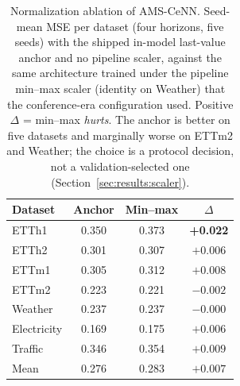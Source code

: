 \begin{table}[!htbp]
\centering
\caption{Normalization ablation of AMS-CeNN. Seed-mean MSE per dataset (four horizons, five seeds) with the shipped in-model last-value anchor and no pipeline scaler, against the same architecture trained under the pipeline min--max scaler (identity on Weather) that the conference-era configuration used. Positive $\Delta$ = min--max \emph{hurts}. The anchor is better on five datasets and marginally worse on ETTm2 and Weather; the choice is a protocol decision, not a validation-selected one (Section~\ref{sec:results:scaler}).}
\label{tab:scaler_ams}
\begin{tabular}{lccc}
\toprule
Dataset & Anchor & Min--max & $\Delta$ \\
\midrule
ETTh1 & 0.350 & 0.373 & \textbf{+0.022} \\
ETTh2 & 0.301 & 0.307 & $+0.006$ \\
ETTm1 & 0.305 & 0.312 & $+0.008$ \\
ETTm2 & 0.223 & 0.221 & $-0.002$ \\
Weather & 0.237 & 0.237 & $-0.000$ \\
Electricity & 0.169 & 0.175 & $+0.006$ \\
Traffic & 0.346 & 0.354 & $+0.009$ \\
\midrule
Mean & 0.276 & 0.283 & $+0.007$ \\
\bottomrule
\end{tabular}
\end{table}
